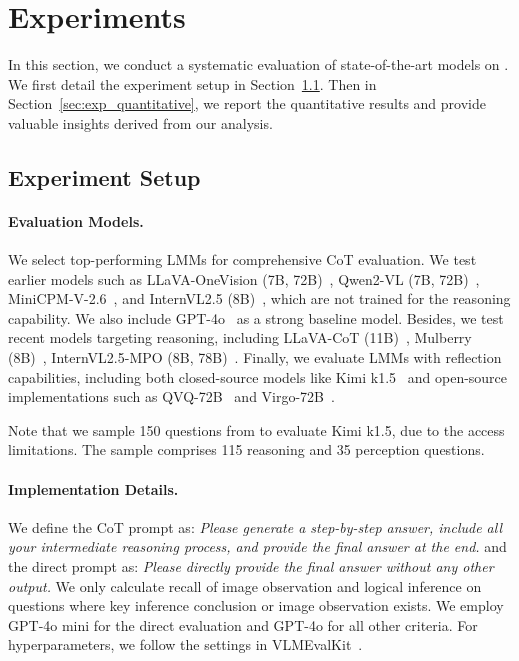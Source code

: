 \section{Experiments}
In this section, we conduct a systematic evaluation of state-of-the-art models on \dataset. We first detail the experiment setup in Section~\ref{sec:exp_steup}. Then in Section~\ref{sec:exp_quantitative}, we report the quantitative results and provide valuable insights derived from our analysis.

\subsection{Experiment Setup}
\label{sec:exp_steup}
\paragraph{Evaluation Models.} 
We select top-performing LMMs for comprehensive CoT evaluation. We test earlier models such as LLaVA-OneVision (7B, 72B)~\cite{li2024llava-ov}, Qwen2-VL (7B, 72B)~\cite{Qwen2-VL}, MiniCPM-V-2.6~\cite{yao2024minicpm}, and InternVL2.5 (8B)~\cite{chen2024expanding}, which are not trained for the reasoning capability. We also include GPT-4o~\cite{openai2024gpt4o} as a strong baseline model.
Besides, we test recent models targeting reasoning, including LLaVA-CoT (11B)~\cite{xu2024llavacot}, Mulberry (8B)~\cite{yao2024mulberry}, InternVL2.5-MPO (8B, 78B)~\cite{wang2024mpo}.
Finally, we evaluate LMMs with reflection capabilities, including both closed-source models like Kimi k1.5~\cite{team2025kimi} and open-source implementations such as QVQ-72B~\cite{qvq-72b-preview} and Virgo-72B~\cite{du2025virgo}.

Note that we sample 150 questions from \dataset to evaluate Kimi k1.5, due to the access limitations. The sample comprises 115 reasoning and 35 perception questions. 




\paragraph{Implementation Details.}
We define the CoT prompt as: \textit{Please generate a step-by-step answer, include all your intermediate reasoning process, and provide the final answer at the end.} and the direct prompt as: \textit{Please directly provide the final answer without any other output.}
We only calculate recall of image observation and logical inference on questions where key inference conclusion or image observation exists.
We employ GPT-4o mini for the direct evaluation and GPT-4o for all other criteria. For hyperparameters, we follow the settings in VLMEvalKit~\cite{duan2024vlmevalkit}. 

